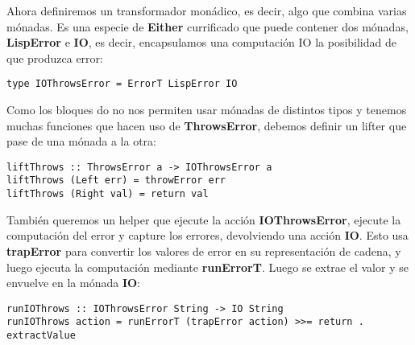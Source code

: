 Ahora definiremos un transformador mon\'adico, es decir, algo que combina varias m\'onadas. Es una especie de \textbf{Either} currificado que puede contener dos m\'onadas, \textbf{LispError} e \textbf{IO}, es decir, encapsulamos una computaci\'on IO la posibilidad de que produzca error:\\

\begin{minipage}{\linewidth}
\begin{footnotesize}
\begin{lstlisting}[frame=single]
type IOThrowsError = ErrorT LispError IO
\end{lstlisting}
\end{footnotesize}
\end{minipage}

Como los bloques do no nos permiten usar m\'onadas de distintos tipos y tenemos muchas funciones que hacen uso de \textbf{ThrowsError}, debemos definir un lifter que pase de una m\'onada a la otra:\\

\begin{minipage}{\linewidth}
\begin{footnotesize}
\begin{lstlisting}[frame=single]
liftThrows :: ThrowsError a -> IOThrowsError a
liftThrows (Left err) = throwError err
liftThrows (Right val) = return val
\end{lstlisting}
\end{footnotesize}
\end{minipage}

Tambi\'en queremos un helper que ejecute la acci\'on \textbf{IOThrowsError}, ejecute la computaci\'on del error y capture los errores, devolviendo una acci\'on \textbf{IO}. Esto usa \textbf{trapError} para convertir los valores de error en su representaci\'on de cadena, y luego ejecuta la computaci\'on mediante \textbf{runErrorT}. Luego se extrae el valor y se envuelve en la m\'onada \textbf{IO}:\\

\begin{minipage}{\linewidth}
\begin{scriptsize}
\begin{lstlisting}[frame=single]
runIOThrows :: IOThrowsError String -> IO String
runIOThrows action = runErrorT (trapError action) >>= return . extractValue
\end{lstlisting}
\end{scriptsize}
\end{minipage}

